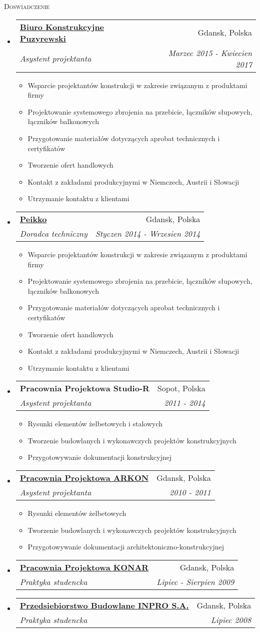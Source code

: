\documentclass[letterpaper,11pt]{article}
\makeatletter
\newcommand{\resheading}[1]{
  \begin{tcolorbox}
  \textsc{#1}
  \end{tcolorbox}
}
\newcommand{\resitem}[1]{\item #1 \vspace{-2pt}}
\newcommand{\ressubheading}[4]{
\begin{tabular*}{6.5in}{l@{\extracolsep{\fill}}r}
		\textbf{#1} & #2 \\
		\textit{#3} & \textit{#4} \\
\end{tabular*}\vspace{-6pt}}
\makeatother
\begin{document}
\resheading{Doswiadczenie}
\begin{itemize}

\item
  \ressubheading{\href{www.puzyrewski.pl}{Biuro Konstrukcyjne Puzyrewski}}{Gdansk, Polska}{Asystent projektanta}{Marzec 2015 - Kwiecien 2017}
	\begin{itemize}
      \resitem{Wsparcie projektantów konstrukcji w zakresie związanym z produktami firmy}
      \resitem{Projektowanie systemowego zbrojenia na przebicie, łączników słupowych, łączników balkonowych}
      \resitem{Przygotowanie materiałów dotyczących aprobat technicznych i certyfikatów}
      \resitem{Tworzenie ofert handlowych}
      \resitem{Kontakt z zakładami produkcyjnymi w Niemczech, Austrii i Słowacji}
      \resitem{Utrzymanie kontaktu z klientami}
	\end{itemize}
\item
	\ressubheading{\href{www.peikko.pl}{Peikko}}{Gdansk, Polska}{Doradca techniczny}{Styczen 2014 - Wrzesien 2014}
	\begin{itemize}
      \resitem{Wsparcie projektantów konstrukcji w zakresie związanym z produktami firmy}
      \resitem{Projektowanie systemowego zbrojenia na przebicie, łączników słupowych, łączników balkonowych}
      \resitem{Przygotowanie materiałów dotyczących aprobat technicznych i certyfikatów}
      \resitem{Tworzenie ofert handlowych}
      \resitem{Kontakt z zakładami produkcyjnymi w Niemczech, Austrii i Słowacji}
      \resitem{Utrzymanie kontaktu z klientami}
	\end{itemize}

\item 
	\ressubheading{Pracownia Projektowa Studio-R}{Sopot, Polska}{Asystent projektanta}{2011 - 2014}
	\begin{itemize}
      \resitem{Rysunki elementów żelbetowych i stalowych}
      \resitem{Tworzenie budowlanych i wykonawczych projektów konstrukcyjnych}
      \resitem{Przygotowywanie dokumentacji konstrukcyjnej}
	\end{itemize}

\item
	\ressubheading{\href{http://www.konar.eu/}{Pracownia Projektowa ARKON}}{Gdansk, Polska}{Asystent projektanta}{2010 - 2011}
	\begin{itemize}
      \resitem{Rysunki elementów żelbetowych}
      \resitem{Tworzenie budowlanych i wykonawczych projektów konstrukcyjnych}
      \resitem{Przygotowywanie dokumentacji architektoniczno-konstrukcyjnej}
	\end{itemize}

\item
	\ressubheading{\href{http://www.konar.eu/}{Pracownia Projektowa KONAR}}{Gdansk, Polska}{Praktyka studencka}{Lipiec - Sierpien 2009}

\item
	\ressubheading{\href{https://www.inpro.com.pl}{Przedsiebiorstwo Budowlane INPRO S.A.}}{Gdansk, Polska}{Praktyka studencka}{Lipiec 2008}

\end{itemize}
\end{document}

